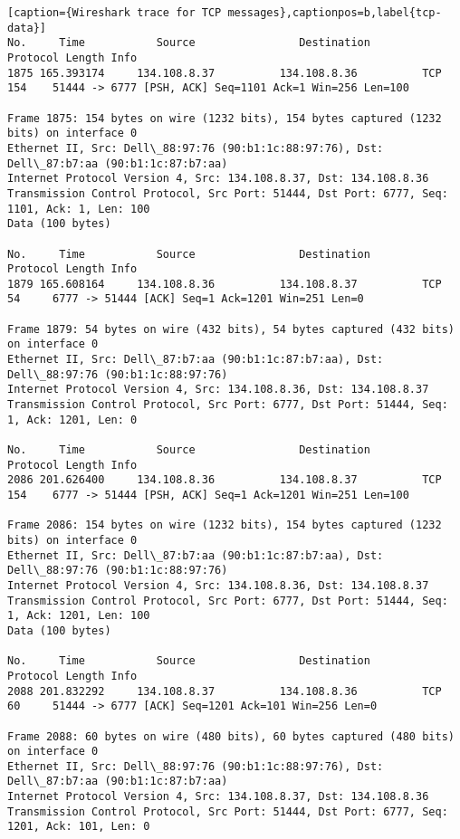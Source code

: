 \begin{lstlisting}[caption={Wireshark trace for TCP messages},captionpos=b,label{tcp-data}]
No.     Time           Source                Destination           Protocol Length Info
1875 165.393174     134.108.8.37          134.108.8.36          TCP      154    51444 -> 6777 [PSH, ACK] Seq=1101 Ack=1 Win=256 Len=100

Frame 1875: 154 bytes on wire (1232 bits), 154 bytes captured (1232 bits) on interface 0
Ethernet II, Src: Dell\_88:97:76 (90:b1:1c:88:97:76), Dst: Dell\_87:b7:aa (90:b1:1c:87:b7:aa)
Internet Protocol Version 4, Src: 134.108.8.37, Dst: 134.108.8.36
Transmission Control Protocol, Src Port: 51444, Dst Port: 6777, Seq: 1101, Ack: 1, Len: 100
Data (100 bytes)

No.     Time           Source                Destination           Protocol Length Info
1879 165.608164     134.108.8.36          134.108.8.37          TCP      54     6777 -> 51444 [ACK] Seq=1 Ack=1201 Win=251 Len=0

Frame 1879: 54 bytes on wire (432 bits), 54 bytes captured (432 bits) on interface 0
Ethernet II, Src: Dell\_87:b7:aa (90:b1:1c:87:b7:aa), Dst: Dell\_88:97:76 (90:b1:1c:88:97:76)
Internet Protocol Version 4, Src: 134.108.8.36, Dst: 134.108.8.37
Transmission Control Protocol, Src Port: 6777, Dst Port: 51444, Seq: 1, Ack: 1201, Len: 0

No.     Time           Source                Destination           Protocol Length Info
2086 201.626400     134.108.8.36          134.108.8.37          TCP      154    6777 -> 51444 [PSH, ACK] Seq=1 Ack=1201 Win=251 Len=100

Frame 2086: 154 bytes on wire (1232 bits), 154 bytes captured (1232 bits) on interface 0
Ethernet II, Src: Dell\_87:b7:aa (90:b1:1c:87:b7:aa), Dst: Dell\_88:97:76 (90:b1:1c:88:97:76)
Internet Protocol Version 4, Src: 134.108.8.36, Dst: 134.108.8.37
Transmission Control Protocol, Src Port: 6777, Dst Port: 51444, Seq: 1, Ack: 1201, Len: 100
Data (100 bytes)

No.     Time           Source                Destination           Protocol Length Info
2088 201.832292     134.108.8.37          134.108.8.36          TCP      60     51444 -> 6777 [ACK] Seq=1201 Ack=101 Win=256 Len=0

Frame 2088: 60 bytes on wire (480 bits), 60 bytes captured (480 bits) on interface 0
Ethernet II, Src: Dell\_88:97:76 (90:b1:1c:88:97:76), Dst: Dell\_87:b7:aa (90:b1:1c:87:b7:aa)
Internet Protocol Version 4, Src: 134.108.8.37, Dst: 134.108.8.36
Transmission Control Protocol, Src Port: 51444, Dst Port: 6777, Seq: 1201, Ack: 101, Len: 0
\end{lstlisting}
